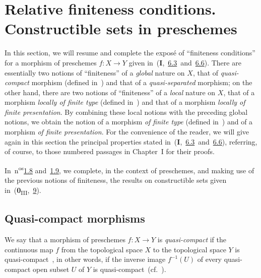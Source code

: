 \section{Relative finiteness conditions. Constructible sets in preschemes}
\label{section:IV.1}

In this section, we will resume and complete the expos\'e of ``finiteness conditions'' for a morphism of preschemes $f:X\to Y$ given in~(\textbf{I},~\hyperref[subsection:I.6.3]{6.3}~and~\hyperref[subsection:I.6.6]{6.6}).
There are essentially two notions of ``finiteness'' of a \emph{global} nature on $X$, that of \emph{quasi-compact} morphism (defined in~) and that of a \emph{quasi-separated} morphism; on the other hand, there are two notions of ``finiteness'' of a \emph{local} nature on $X$, that of a morphism \emph{locally of finite type} (defined in~) and that of a morphism \emph{locally of finite presentation}.
By combining these local notions with the preceding global notions, we obtain the notion of a morphism \emph{of finite type} (defined in~) and of a morphism \emph{of finite presentation}.
For the convenience of the reader, we will give again in this section the principal properties stated in~(\textbf{I},~\hyperref[subsection:I.6.3]{6.3}~and~\hyperref[subsection:I.6.6]{6.6}), referring, of course, to those numbered passages in Chapter~I for their proofs.

In~n\textsuperscript{os}{\hyperlink{ega4.c04.subsec.1-8}{1.8}} and~{\hyperlink{ega4.c04.subsec.1-9}{1.9}}, we complete, in the context of preschemes, and making use of the previous notions of finiteness, the results on constructible sets given in~(\textbf{0}\textsubscript{III},~\textsection\hyperref[section:0.9]{9}).

\subsection{Quasi-compact morphisms}
\label{subsection:IV.1.1}

\begin{definition}[1.1.1]
\label{IV.1.1.1}
We say that a morphism of preschemes $f:X\to Y$ is \emph{quasi-compact} if the continuous map $f$ from the topological space $X$ to the topological space $Y$ is quasi-compact~, in other words, if the inverse image $f^{-1}(U)$ of every quasi-compact open subset $U$ of $Y$ is quasi-compact~(cf.~).
\end{definition}

